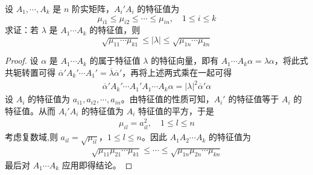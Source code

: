 \documentclass[../../main.tex]{subfiles}
\begin{document}
\begin{example}\label{example:例9.56}
设 \(A_1,\cdots,A_k\) 是 \(n\) 阶实矩阵，\(A_i'A_i\) 的特征值为
\[
\mu_{i1} \leqslant  \mu_{i2} \leqslant  \cdots \leqslant  \mu_{in},\quad 1\leqslant  i \leqslant  k
\]
求证：若 \(\lambda\) 是 \(A_1\cdots A_k\) 的特征值，则
\[
\sqrt{\mu_{11}\cdots\mu_{k1}} \leqslant  |\lambda| \leqslant  \sqrt{\mu_{1n}\cdots\mu_{kn}}
\]
\end{example}
\begin{proof}
设 \(\alpha\) 是 \(A_1\cdots A_k\) 的属于特征值 \(\lambda\) 的特征向量，即有 \(A_1\cdots A_k\alpha = \lambda\alpha\)，将此式共轭转置可得 \(\overline{\alpha}'A_k'\cdots A_1' = \overline{\lambda}\overline{\alpha}'\)，再将上述两式乘在一起可得
\begin{align*}
\overline{\alpha}'A_k'\cdots A_1'A_1\cdots A_k\alpha = |\lambda|^2\overline{\alpha}'\alpha
\end{align*}
设 \(A_i\) 的特征值为 \(a_{i1},a_{i2},\cdots,a_{in}\)。由特征值的性质可知，\(A_i'\) 的特征值等于 \(A_i\) 的特征值。从而 \(A_i'A_i\) 的特征值为 \(A_i\) 特征值的平方，于是
\begin{align*}
\mu_{il} = a_{il}^2,\quad 1\leqslant  l \leqslant  n
\end{align*}
考虑复数域,则 \(a_{il} = \sqrt{\mu_{il}}\)，\(1\leqslant  l \leqslant  n\)。因此 \(A_1A_2\cdots A_k\) 的特征值为
\begin{align*}
\sqrt{\mu_{11}\mu_{21}\cdots\mu_{k1}} \leqslant  \cdots \leqslant  \sqrt{\mu_{1n}\mu_{2n}\cdots\mu_{kn}}
\end{align*}
最后对 \(A_1\cdots A_k\) 应用即得结论。 

\end{proof}
\end{document}
